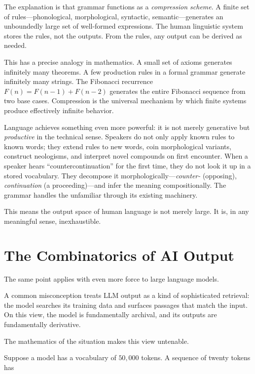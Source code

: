 \documentclass[12pt]{article}
\begin{document}
The explanation is that grammar functions as a \emph{compression scheme}. A finite set of rules---phonological, morphological, syntactic, semantic---generates an unboundedly large set of well-formed expressions. The human linguistic system stores the rules, not the outputs. From the rules, any output can be derived as needed.

This has a precise analogy in mathematics. A small set of axioms generates infinitely many theorems. A few production rules in a formal grammar generate infinitely many strings. The Fibonacci recurrence $F(n) = F(n-1) + F(n-2)$ generates the entire Fibonacci sequence from two base cases. Compression is the universal mechanism by which finite systems produce effectively infinite behavior.

Language achieves something even more powerful: it is not merely generative but \emph{productive} in the technical sense. Speakers do not only apply known rules to known words; they extend rules to new words, coin morphological variants, construct neologisms, and interpret novel compounds on first encounter. When a speaker hears ``countercontinuation'' for the first time, they do not look it up in a stored vocabulary. They decompose it morphologically---\textit{counter-} (opposing), \textit{continuation} (a proceeding)---and infer the meaning compositionally. The grammar handles the unfamiliar through its existing machinery.

This means the output space of human language is not merely large. It is, in any meaningful sense, inexhaustible.

\section{The Combinatorics of AI Output}

The same point applies with even more force to large language models.

A common misconception treats LLM output as a kind of sophisticated retrieval: the model searches its training data and surfaces passages that match the input. On this view, the model is fundamentally archival, and its outputs are fundamentally derivative.

The mathematics of the situation makes this view untenable.

Suppose a model has a vocabulary of $50{,}000$ tokens. A sequence of twenty tokens has
\end{document}
